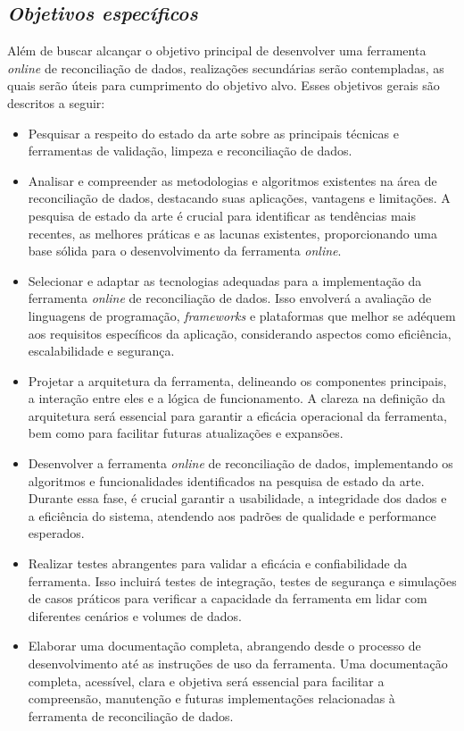 \subsection{\textit{Objetivos específicos}}

Além de buscar alcançar o objetivo principal de desenvolver uma ferramenta \textit{online} de reconciliação de dados, realizações secundárias serão contempladas, as quais serão úteis para cumprimento do objetivo alvo. Esses objetivos gerais são descritos a seguir: 

\begin{itemize}

\item Pesquisar a respeito do estado da arte sobre as principais técnicas e ferramentas de validação, limpeza e reconciliação de dados. 

\item Analisar e compreender as metodologias e algoritmos existentes na área de reconciliação de dados, destacando suas aplicações, vantagens e limitações. A pesquisa de estado da arte é crucial para identificar as tendências mais recentes, as melhores práticas e as lacunas existentes, proporcionando uma base sólida para o desenvolvimento da ferramenta \textit{online}.

\item Selecionar e adaptar as tecnologias adequadas para a implementação da ferramenta \textit{online} de reconciliação de dados. Isso envolverá a avaliação de linguagens de programação, \textit{frameworks} e plataformas que melhor se adéquem aos requisitos específicos da aplicação, considerando aspectos como eficiência, escalabilidade e segurança.

\item Projetar a arquitetura da ferramenta, delineando os componentes principais, a interação entre eles e a lógica de funcionamento. A clareza na definição da arquitetura será essencial para garantir a eficácia operacional da ferramenta, bem como para facilitar futuras atualizações e expansões.

\item Desenvolver a ferramenta \textit{online} de reconciliação de dados, implementando os algoritmos e funcionalidades identificados na pesquisa de estado da arte. Durante essa fase, é crucial garantir a usabilidade, a integridade dos dados e a eficiência do sistema, atendendo aos padrões de qualidade e performance esperados.

\item Realizar testes abrangentes para validar a eficácia e confiabilidade da ferramenta. Isso incluirá testes de integração, testes de segurança e simulações de casos práticos para verificar a capacidade da ferramenta em lidar com diferentes cenários e volumes de dados.

\item Elaborar uma documentação completa, abrangendo desde o processo de desenvolvimento até as instruções de uso da ferramenta. Uma documentação completa, acessível, clara e objetiva será essencial para facilitar a compreensão, manutenção e futuras implementações relacionadas à ferramenta de reconciliação de dados.
\end{itemize}

